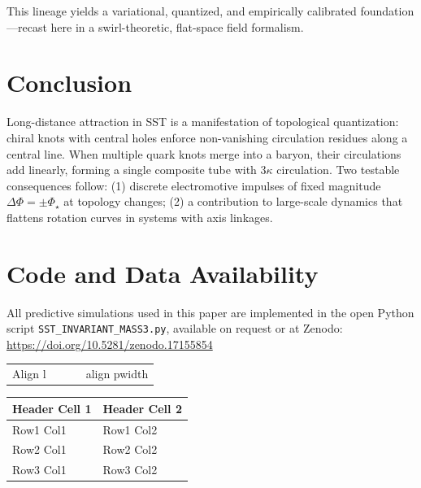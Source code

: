 \documentclass[11pt]{article}
\begin{document}
        This lineage yields a variational, quantized, and empirically calibrated foundation—recast here in a swirl-theoretic, flat-space field formalism.

\section{Conclusion}

    Long-distance attraction in SST is a manifestation of topological quantization: chiral knots with central holes enforce non-vanishing circulation residues along a central line.
    When multiple quark knots merge into a baryon, their circulations add linearly, forming a single composite tube with $3\kappa$ circulation.
    Two testable consequences follow: (1) discrete electromotive impulses of fixed magnitude $\Delta\Phi=\pm\Phi_\star$ at topology changes; (2) a contribution to large-scale dynamics that flattens rotation curves in systems with axis linkages.


\section*{Code and Data Availability}
    All predictive simulations used in this paper are implemented in the open Python script \texttt{SST\_INVARIANT\_MASS3.py}, available on request or at Zenodo: \url{https://doi.org/10.5281/zenodo.17155854}

\begin{table}[htbp]
    \centering
    \begin{tabular}{p{0.5\linewidth}l}
        Align l & align p{width}
    \end{tabular}
\end{table}

\begin{table}[htbp]
\centering
\begin{tabular}{ll}
\toprule
Header Cell 1 & Header Cell 2 \\
\midrule
Row1 Col1 & Row1 Col2 \\
Row2 Col1 & Row2 Col2 \\
Row3 Col1 & Row3 Col2 \\
\bottomrule
\end{tabular}
\end{table}
\end{document}
